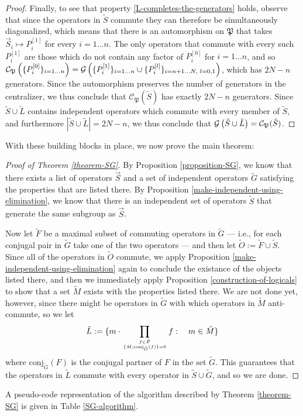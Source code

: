 \documentclass[twocolumn,showpacs,preprintnumbers,amsmath,amssymb,nofootinbib,pra,floatfix]{revtex4-1}
\newenvironment{remark}[1][Remark]{\begin{trivlist}
\item[\hskip \labelsep {\bfseries #1}]}{\end{trivlist}}
\newcommand{\lst}{\vec}
\newcommand{\set}{\tilde}
\newcommand{\genfun}{\mathcal{G}}
\newcommand{\pauligroup}{\mathfrak{P}}
\newcommand{\centralizer}{\mathcal{C}}
\begin{document}
\begin{proof}
Finally, to see that property \ref{L-completes-the-generators} holds, observe that since the operators in $\set S$ commute they can therefore be simultaneously diagonalized, which means that there is an automorphism on $\pauligroup$ that takes $\lst S_i\mapsto P_i^{[1]}$ for every $i=1 \dots n$.  The only operators that commute with every such $P_i^{[1]}$ are those which do not contain any factor of $P_i^{[0]}$ for $i=1 \dots n$, and so $\centralizer_\pauligroup\paren{\{P_i^{[0]}\}_{i=1\dots n}} = \genfun\paren{\{P_i^{[1]}\}_{i=1 \dots n}\cup \{P_i^{[l]}\}_{i=n+1 \dots N, \,\, l=0,1}}$, which has $2N-n$ generators.  Since the automorphism preserves the number of generators in the centralizer, we thus conclude that $\centralizer_\pauligroup(\set S)$ has exactly $2N-n$ generators.  Since $\set S\cup\set L$ contains independent operators which commute with every member of $\set S$, and furthermore $|\set S\cup\set L|=2N-n$, we thus conclude that $\genfun\paren{\set S\cup\set L}=\centralizer_\pauligroup(\set S)$.
\end{proof}
With these building blocks in place, we now prove the main theorem:

\begin{proof}[Proof of Theorem \ref{theorem-SG}]
By Proposition \ref{proposition-SG}, we know that there exists a list of operators $\lst S$ and a set of independent operators $\set G$ satisfying the properties that are listed there.  By Proposition \ref{make-independent-using-elimination}, we know that there is an independent set of operators $\set S$ that generate the same subgroup as $\lst S$.  

Now let $\set F$ be a maximal subset of commuting operators in $\set G$ --- i.e., for each conjugal pair in $\set G$ take one of the two operators --- and then let $\set O := \set F \cup \set S$.  Since all of the operators in $\set O$ commute, we apply Proposition \ref{make-independent-using-elimination} again to conclude the existance of the objects listed there, and then we immediately apply Proposition \ref{construction-of-logicals} to show that a set $\set M$ exists with the properties listed there.  We are not done yet, however, since there might be operators in $\set G$ with which operators in $\set M$ anti-commute, so we let
$$\set L := \{m\cdot\prod_{f\in \set F\atop \{M,\text{conj}_{\set G}(f)\}=0} f :\quad m \in\set M\}$$
where $\text{conj}_{\set G}(F)$ is the conjugal partner of $F$ in the set $\set G$.  This guarantees that the operators in $\set L$ commute with every operator in $\set S\cup\set G$, and so we are done.
\end{proof}
\begin{remark}
A pseudo-code representation of the algorithm described by Theorem \ref{theorem-SG} is given in Table \ref{SG-algorithm}.
\end{remark}
\end{document}
